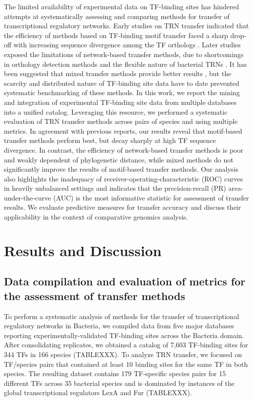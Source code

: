 The limited availability of experimental data on TF-binding sites has hindered
attempts at systematically assessing and comparing methods for transfer of
transcriptional regulatory networks. Early studies on TRN transfer indicated
that the efficiency of methods based on TF-binding motif transfer faced a sharp
drop-off with increasing sequence divergence among the TF orthologs
\cite{yu2004annotation}. Later studies exposed the limitations of network-based
transfer methods, due to shortcomings in orthology detection methods and the
flexible nature of bacterial TRNs \cite{babu2006evolutionary,
  chavez2006bacterial, price2007orthologous}. It has been suggested that mixed
transfer methods provide better results \cite{baumbach2010power}, but the
scarcity and distributed nature of TF-binding site data have to date prevented
systematic benchmarking of these methods. In this work, we report the mining
and integration of experimental TF-binding site data from multiple databases
into a unified catalog. Leveraging this resource, we performed a systematic
evaluation of TRN transfer methods across pairs of species and using multiple
metrics. In agreement with previous reports, our results reveal that
motif-based transfer methods perform best, but decay sharply at high TF
sequence divergence. In contrast, the efficiency of network-based transfer
methods is poor and weakly dependent of phylogenetic distance, while mixed
methods do not significantly improve the results of motif-based transfer
methods. Our analysis also highlights the inadequacy of
receiver-operating-characteristic (ROC) curves in heavily unbalanced settings
and indicates that the precision-recall (PR) area-under-the-curve (AUC) is the
most informative statistic for assessment of transfer results. We evaluate
predictive measures for transfer accuracy and discuss their applicability in
the context of comparative genomics analysis.


\section{Results and Discussion}

\subsection{Data compilation and evaluation of metrics for the assessment of
  transfer methods}

To perform a systematic analysis of methods for the transfer of transcriptional
regulatory networks in Bacteria, we compiled data from five major databases
reporting experimentally-validated TF-binding sites across the Bacteria
domain. After consolidating replicates, we obtained a catalog of 7,603
TF-binding sites for 344 TFs in 166 species (TABLEXXX). To analyze TRN
transfer, we focused on TF/species pairs that contained at least 10 binding
sites for the same TF in both species. The resulting dataset contains 179
TF-specific species pairs for 15 different TFs across 35 bacterial species and
is dominated by instances of the global transcriptional regulators LexA and Fur
(TABLEXXX).

